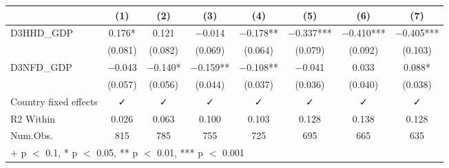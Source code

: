 \begin{table}
\centering
\begin{tabular}[t]{lccccccc}
\toprule
  & (1) & (2) & (3) & (4) & (5) & (6) & (7)\\
\midrule
D3HHD\_GDP & \num{0.176}* & \num{0.121} & \num{-0.014} & \num{-0.178}** & \num{-0.337}*** & \num{-0.410}*** & \num{-0.405}***\\
 & (\num{0.081}) & (\num{0.082}) & (\num{0.069}) & (\num{0.064}) & (\num{0.079}) & (\num{0.092}) & (\num{0.103})\\
D3NFD\_GDP & \num{-0.043} & \num{-0.140}* & \num{-0.159}** & \num{-0.108}** & \num{-0.041} & \num{0.033} & \num{0.088}*\\
 & (\num{0.057}) & (\num{0.056}) & (\num{0.044}) & (\num{0.037}) & (\num{0.036}) & (\num{0.040}) & (\num{0.038})\\
\midrule
Country fixed effects & ✓ & ✓ & ✓ & ✓ & ✓ & ✓ & ✓\\
R2 Within & \num{0.026} & \num{0.063} & \num{0.100} & \num{0.103} & \num{0.128} & \num{0.138} & \num{0.128}\\
Num.Obs. & \num{815} & \num{785} & \num{755} & \num{725} & \num{695} & \num{665} & \num{635}\\
\bottomrule
\multicolumn{8}{l}{\rule{0pt}{1em}+ p $<$ 0.1, * p $<$ 0.05, ** p $<$ 0.01, *** p $<$ 0.001}\\
\end{tabular}
\end{table}
